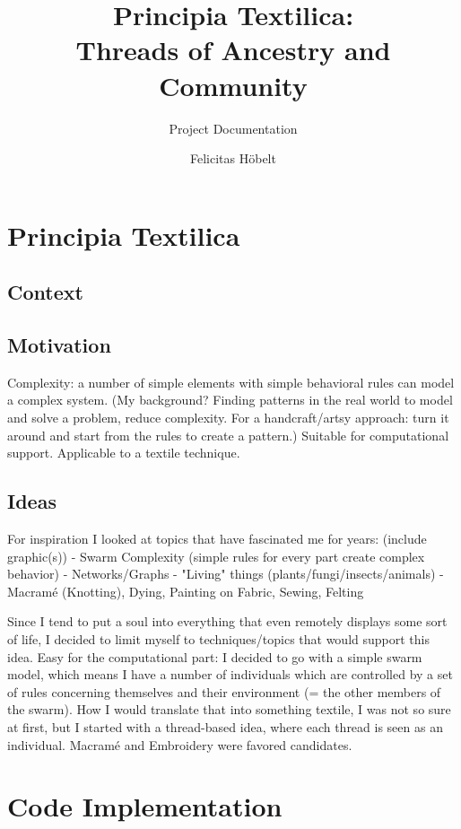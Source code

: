\documentclass{scrartcl}
\title{Principia Textilica:\\ Threads of Ancestry and Community}
\subtitle{Project Documentation}
\author{Felicitas Höbelt}
\begin{document}
\maketitle

\section{Principia Textilica}

\subsection{Context}

\subsection{Motivation}

Complexity:  a number of simple elements with simple behavioral rules can model a complex system.
(My background? Finding patterns in the real world to model and solve a problem, reduce complexity. For a handcraft/artsy approach: turn it around and start from the rules to create a pattern.)
Suitable for computational support. Applicable to a textile technique.

\subsection{Ideas}

For inspiration I looked at topics that have fascinated me for years: (include graphic(s))
-	Swarm Complexity (simple rules for every part create complex behavior)
-	Networks/Graphs
-	"Living" things (plants/fungi/insects/animals)
-	Macramé (Knotting), Dying, Painting on Fabric, Sewing, Felting

Since I tend to put a soul into everything that even remotely displays some sort of life, I decided to limit myself to techniques/topics that would support this idea.
Easy for the computational part: I decided to go with a simple swarm model, which means I have a number of individuals which are controlled by a set of rules concerning themselves and their environment (= the other members of the swarm).
How I would translate that into something textile, I was not so sure at first, but I started with a thread-based idea, where each thread is seen as an individual. Macramé and Embroidery were favored candidates.

\section{Code Implementation}
\end{document}

